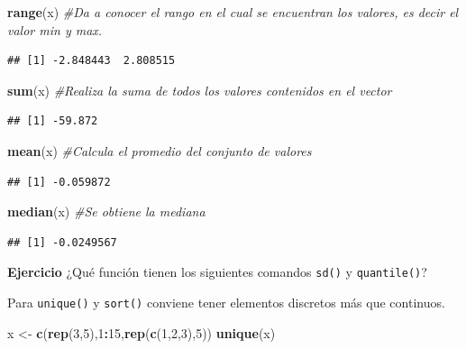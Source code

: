 \documentclass[
]{book}
\newenvironment{Shaded}{\begin{snugshade}}{\end{snugshade}}
\newcommand{\CommentTok}[1]{\textcolor[rgb]{0.56,0.35,0.01}{\textit{#1}}}
\newcommand{\DecValTok}[1]{\textcolor[rgb]{0.00,0.00,0.81}{#1}}
\newcommand{\FunctionTok}[1]{\textcolor[rgb]{0.13,0.29,0.53}{\textbf{#1}}}
\newcommand{\NormalTok}[1]{#1}
\newcommand{\OtherTok}[1]{\textcolor[rgb]{0.56,0.35,0.01}{#1}}
\newcommand{\SpecialCharTok}[1]{\textcolor[rgb]{0.81,0.36,0.00}{\textbf{#1}}}
\begin{document}
\begin{Shaded}
\begin{Highlighting}[]
\FunctionTok{range}\NormalTok{(x) }\CommentTok{\#Da a conocer el rango en el cual se encuentran los valores, es decir el valor min y max. }
\end{Highlighting}
\end{Shaded}

\begin{verbatim}
## [1] -2.848443  2.808515
\end{verbatim}

\begin{Shaded}
\begin{Highlighting}[]
\FunctionTok{sum}\NormalTok{(x) }\CommentTok{\#Realiza la suma de todos los valores contenidos en el vector }
\end{Highlighting}
\end{Shaded}

\begin{verbatim}
## [1] -59.872
\end{verbatim}

\begin{Shaded}
\begin{Highlighting}[]
\FunctionTok{mean}\NormalTok{(x) }\CommentTok{\#Calcula el promedio del conjunto de valores }
\end{Highlighting}
\end{Shaded}

\begin{verbatim}
## [1] -0.059872
\end{verbatim}

\begin{Shaded}
\begin{Highlighting}[]
\FunctionTok{median}\NormalTok{(x) }\CommentTok{\#Se obtiene la mediana }
\end{Highlighting}
\end{Shaded}

\begin{verbatim}
## [1] -0.0249567
\end{verbatim}

\textbf{Ejercicio} ¿Qué función tienen los siguientes comandos \texttt{sd()} y \texttt{quantile()}?

Para \texttt{unique()} y \texttt{sort()} conviene tener elementos discretos más que continuos.

\begin{Shaded}
\begin{Highlighting}[]
\NormalTok{x }\OtherTok{\textless{}{-}} \FunctionTok{c}\NormalTok{(}\FunctionTok{rep}\NormalTok{(}\DecValTok{3}\NormalTok{,}\DecValTok{5}\NormalTok{),}\DecValTok{1}\SpecialCharTok{:}\DecValTok{15}\NormalTok{,}\FunctionTok{rep}\NormalTok{(}\FunctionTok{c}\NormalTok{(}\DecValTok{1}\NormalTok{,}\DecValTok{2}\NormalTok{,}\DecValTok{3}\NormalTok{),}\DecValTok{5}\NormalTok{))}
\FunctionTok{unique}\NormalTok{(x)}
\end{Highlighting}
\end{Shaded}
\end{document}
